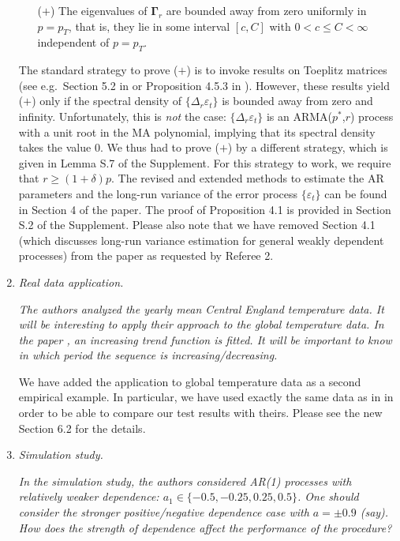 \documentclass[a4paper,12pt]{article}
\begin{document}
\begin{enumerate}[label=(\arabic*),leftmargin=0.7cm]
\begin{itemize}[leftmargin=0.8cm]
\item[($+$)] The eigenvalues of $\boldsymbol{\Gamma}_r$ are bounded away from zero uniformly in $p=p_T$, that is, they lie in some interval $[c,C]$ with $0 < c \le C < \infty$ independent of $p=p_T$. 
\end{itemize}
The standard strategy to prove ($+$) is to invoke results on Toeplitz matrices (see e.g.\ Section 5.2 in \cite{GrenanderSzego1958} or Proposition 4.5.3 in \cite{BrockwellDavis1991}). However, these results yield ($+$) only if the spectral density of $\{\Delta_r \varepsilon_t\}$ is bounded away from zero and infinity. Unfortunately, this is \textit{not} the case: $\{\Delta_r \varepsilon_t\}$ is an ARMA($p^*$,$r$) process with a unit root in the MA polynomial, implying that its spectral density takes the value $0$. We thus had to prove ($+$) by a different strategy, which is given in Lemma S.7 of the Supplement. For this strategy to work, we require that $r \ge (1+\delta) p$. \newline
%
The revised and extended methods to estimate the AR parameters and the long-run variance of the error process $\{\varepsilon_t\}$  can be found in Section 4 of the paper. The proof of Proposition 4.1 is provided in Section S.2 of the Supplement. Please also note that we have removed Section 4.1 (which discusses long-run variance estimation for general weakly dependent processes) from the paper as requested by Referee 2. 


\item \textit{Real data application.}

\textit{The authors analyzed the yearly mean Central England temperature data. It will be interesting to apply their approach to the global temperature data. In the paper \cite{WuWoodroofeMentz2001}, an increasing trend function is fitted. It will be important to know in which period the sequence is increasing/decreasing.}

We have added the application to global temperature data as a second empirical example. In particular, we have used exactly the same data as in \cite{WuWoodroofeMentz2001} in order to be able to compare our test results with theirs. Please see the new Section 6.2 for the details.


\item \textit{Simulation study.}

\textit{In the simulation study, the authors considered AR(1) processes with relatively weaker dependence: $a_1 \in \{-0.5, -0.25, 0.25, 0.5\}$. One should consider the \linebreak stronger positive/negative dependence case with $a = \pm 0.9$ (say). How does the strength of dependence affect the performance of the procedure?}


\end{enumerate}
\end{document}
